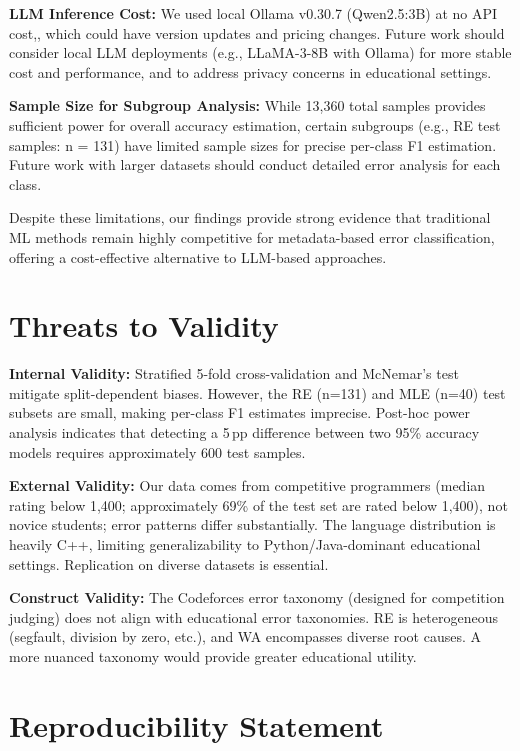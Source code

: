\documentclass[acmsmall]{acmart}
\begin{document}
\textbf{LLM Inference Cost:} We used local Ollama v0.30.7 (Qwen2.5:3B) at no API cost,, which
could have version updates and pricing changes. Future work should consider
local LLM deployments (e.g., LLaMA-3-8B with Ollama) for more stable cost and
performance, and to address privacy concerns in educational settings.

\textbf{Sample Size for Subgroup Analysis:} While 13,360 total samples provides
sufficient power for overall accuracy estimation, certain subgroups (e.g., RE
test samples: n = 131) have limited sample sizes for precise per-class F1
estimation. Future work with larger datasets should conduct detailed error
analysis for each class.

Despite these limitations, our findings provide strong evidence that
traditional ML methods remain highly competitive for metadata-based error
classification, offering a cost-effective alternative to LLM-based approaches.

\section{Threats to Validity}

\textbf{Internal Validity:} Stratified 5-fold cross-validation and McNemar's
test mitigate split-dependent biases. However, the RE (n=131) and MLE (n=40)
test subsets are small, making per-class F1 estimates imprecise. Post-hoc
power analysis indicates that detecting a 5\,pp difference between two 95\%
accuracy models requires approximately 600 test samples.

\textbf{External Validity:} Our data comes from competitive programmers
(median rating below 1,400; approximately 69\% of the test set are rated
below 1,400), not novice students; error patterns differ
substantially. The language distribution is heavily C++, limiting
generalizability to Python/Java-dominant educational settings. Replication on
diverse datasets is essential.

\textbf{Construct Validity:} The Codeforces error taxonomy (designed for
competition judging) does not align with educational error taxonomies. RE is
heterogeneous (segfault, division by zero, etc.), and WA encompasses diverse
root causes. A more nuanced taxonomy would provide greater educational
utility.

\section*{Reproducibility Statement}
\end{document}

